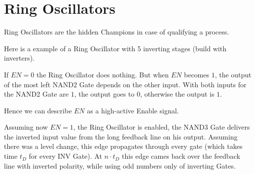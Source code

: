 \section{Ring Oscillators}

Ring Oscillators are the hidden Champions in case of qualifying a process.

Here is a example of a Ring Oscillator with 5 inverting stages (build with inverters).



If $EN = 0$ the Ring Oscillator does nothing. But when $EN$ becomes $1$, the output of the most left NAND2 Gate depends on the other input. With both inputs for the NAND2 Gate are $1$, the output goes to $0$, otherwise the output is $1$.

Hence we can describe $EN$ as a high-active Enable signal.

Assuming now $EN = 1$, the Ring Oscillator is enabled, the NAND3 Gate delivers the inverted input value from the long feedback line on his output. Assuming there was a level change, this edge propagates through every gate (which takes time $t_D$ for every INV Gate). At $n \cdot t_D$ this edge cames back over the feedback line with inverted polarity, while using odd numbers only of inverting Gates.

